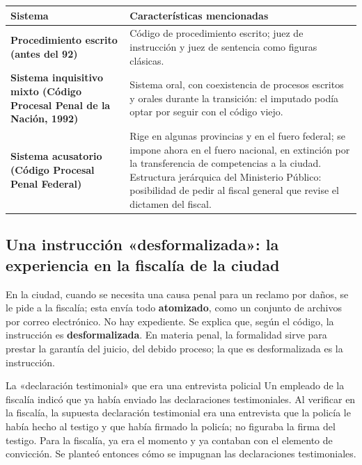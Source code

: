 \documentclass[12pt,oneside]{book}
\begin{document}
\begin{table}[H]
\centering
\small
\begin{tabularx}{\textwidth}{L{0.30\textwidth} Y}
\toprule
\textbf{Sistema} & \textbf{Características mencionadas} \\
\midrule
\textbf{Procedimiento escrito (antes del 92)} & Código de procedimiento escrito; juez de instrucción y juez de sentencia como figuras clásicas. \\
\textbf{Sistema inquisitivo mixto (Código Procesal Penal de la Nación, 1992)} & Sistema oral, con coexistencia de procesos escritos y orales durante la transición: el imputado podía optar por seguir con el código viejo. \\
\textbf{Sistema acusatorio (Código Procesal Penal Federal)} & Rige en algunas provincias y en el fuero federal; se impone ahora en el fuero nacional, en extinción por la transferencia de competencias a la ciudad. Estructura jerárquica del Ministerio Público: posibilidad de pedir al fiscal general que revise el dictamen del fiscal. \\
\bottomrule
\end{tabularx}
\end{table}

\subsection{Una instrucción «desformalizada»: la experiencia en la fiscalía de la ciudad}

En la ciudad, cuando se necesita una causa penal para un reclamo por daños, se le pide a la fiscalía; esta envía todo \textbf{atomizado}, como un conjunto de archivos por correo electrónico. No hay expediente. Se explica que, según el código, la instrucción es \textbf{desformalizada}. En materia penal, la formalidad sirve para prestar la garantía del juicio, del debido proceso; la que es desformalizada es la instrucción.

\begin{example}{La «declaración testimonial» que era una entrevista policial}
Un empleado de la fiscalía indicó que ya había enviado las declaraciones testimoniales. Al verificar en la fiscalía, la supuesta declaración testimonial era una entrevista que la policía le había hecho al testigo y que había firmado la policía; no figuraba la firma del testigo. Para la fiscalía, ya era el momento y ya contaban con el elemento de convicción. Se planteó entonces cómo se impugnan las declaraciones testimoniales.
\end{example}
\end{document}

